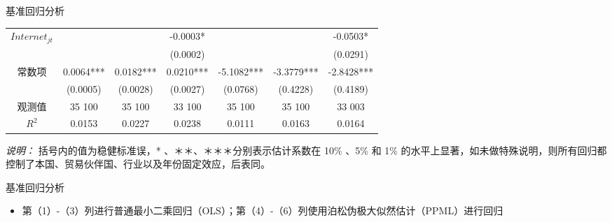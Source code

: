 \documentclass{beamer}
\begin{document}
\begin{frame}{基准回归分析}
{\begin{threeparttable}
\begin{tabular}{ccccccc}
        $Internet_{jt}$ & & & -0.0003* & & & -0.0503* \\
         & & & (0.0002) & & & (0.0291) \\
        常数项 & 0.0064*** & 0.0182*** & 0.0210*** & -5.1082*** & -3.3779*** & -2.8428*** \\
         & (0.0005) & (0.0028) & (0.0027) & (0.0768) & (0.4228) & (0.4189) \\
        观测值 & 35 100 & 35 100 & 33 100 & 35 100 & 35 100 & 33 003 \\
        $R^2$ & 0.0153 & 0.0227 & 0.0238 & 0.0111 & 0.0163 & 0.0164 \\
        \bottomrule
        \end{tabular}
        \begin{tablenotes}
        \item \textit{说明：} 括号内的值为稳健标准误，* 、＊＊、＊＊＊分别表示估计系数在 10\% 、5\% 和 1\% 的水平上显著，如未做特殊说明，则所有回归都控制了本国、贸易伙伴国、行业以及年份固定效应，后表同。
        \end{tablenotes}
        \end{threeparttable}
    }
\end{frame}

\begin{frame}{基准回归分析}
    \begin{itemize}
        \item 第（1）-（3）列进行普通最小二乘回归（OLS）；第（4）-（6）列使用泊松伪极大似然估计（PPML）进行回归
    \end{itemize}
\end{frame}
\end{document}
